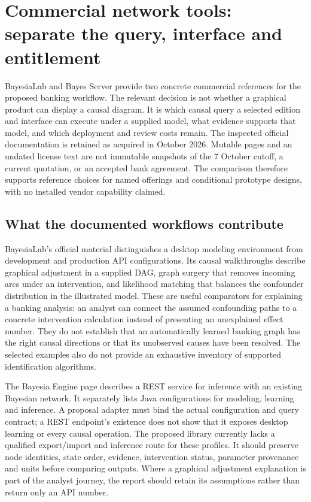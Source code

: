 \section{Commercial network tools: separate the query, interface and entitlement}
\label{sec:exec25-bn-commercial-reuse}

BayesiaLab and Bayes Server provide two concrete commercial references for
the proposed banking workflow. The relevant decision is not whether a
graphical product can display a causal diagram. It is which causal query a
selected edition and interface can execute under a supplied model, what
evidence supports that model, and which deployment and review costs remain.
The inspected official documentation is retained as acquired in October
2026. Mutable pages and an undated license text are not immutable snapshots
of the 7 October cutoff, a current quotation, or an accepted bank agreement.
The comparison therefore supports reference choices for named offerings and
conditional prototype designs, with no installed vendor capability claimed.
\citep{exec13_bayesia_api,exec13_bayesia_professional,exec14_ci_release_history,exec14_ci_eula}

\subsection{What the documented workflows contribute}

BayesiaLab's official material distinguishes a desktop modeling environment
from development and production API configurations. Its causal walkthroughs
describe graphical adjustment in a supplied DAG, graph surgery that removes
incoming arcs under an intervention, and likelihood matching that balances
the confounder distribution in the illustrated model. These are useful
comparators for explaining a banking analysis: an analyst can connect the
assumed confounding paths to a concrete intervention calculation instead of
presenting an unexplained effect number. They do not establish that an
automatically learned banking graph has the right causal directions or that
its unobserved causes have been resolved. The selected examples also do not
provide an exhaustive inventory of supported identification algorithms.
\citep{exec13_ci_bayesia_criteria,exec13_ci_bayesia_surgery,exec13_ci_bayesia_matching}

The Bayesia Engine page describes a REST service for inference with an
existing Bayesian network. It separately lists Java configurations for
modeling, learning and inference. A proposal adapter must bind the actual
configuration and query contract; a REST endpoint's existence does not show
that it exposes desktop learning or every causal operation. The proposed
library currently lacks a qualified export/import and inference route for
these profiles. It should preserve node identities, state order, evidence,
intervention status, parameter provenance and units before comparing outputs.
Where a graphical adjustment explanation is part of the analyst journey,
the report should retain its assumptions rather than return only an API
number.~\citep{exec13_bayesia_api,exec13_ci_bayesia_surgery}

